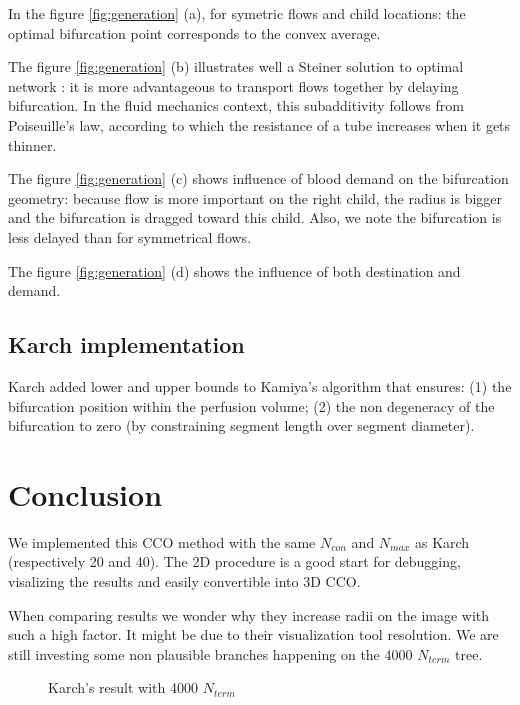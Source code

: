 \documentclass[a4paper, 11pt]{article} %
\begin{document}
In the figure \ref{fig:generation} (a), for symetric flows and child locations: the optimal bifurcation point corresponds to the convex average.

The figure \ref{fig:generation} (b) illustrates well a Steiner solution to optimal network \cite{bernot2009optimal}: it is more advantageous to transport flows together by delaying bifurcation. In the fluid mechanics context, this subadditivity follows from Poiseuille's law, according to which the resistance of a tube increases when it gets thinner.

The figure \ref{fig:generation} (c) shows influence of blood demand on the bifurcation geometry: because flow is more important on the right child, the radius is bigger and the bifurcation is dragged toward this child. Also, we note the bifurcation is less delayed than for symmetrical flows.

The figure \ref{fig:generation} (d) shows the influence of both destination and demand.


\subsection*{Karch implementation}

Karch added lower and upper bounds to Kamiya's algorithm that ensures:
(1) the bifurcation position within the perfusion volume; (2)
the non degeneracy of the bifurcation to zero (by constraining segment length over segment diameter).



\section*{Conclusion}

We implemented this CCO method with the same $N_{con}$ and $N_{max}$ as Karch (respectively 20 and 40). The 2D procedure is a good start for debugging, visalizing the results and easily convertible into 3D CCO.


When comparing results we wonder why they increase radii on the image with such a high factor. It might be due to their visualization tool resolution. We are still investing some non plausible branches happening on the 4000 $N_{term}$ tree.
\begin{figure}[!h]
\centering
{}
\caption{Karch's result with 4000 $N_{term}$ \cite{schreiner1993computer}}
\end{figure}
\end{document}
